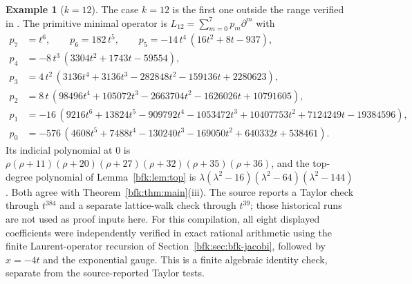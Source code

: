 \documentclass[11pt,a4paper]{article}
\theoremstyle{definition}
\newtheorem{example}[theorem]{Example}
\theoremstyle{remark}
\numberwithin{equation}{section}
\begin{document}
\begin{example}[$k=12$]\label{bfk:ex:k12}
The case $k=12$ is the first one outside the range verified in \cite{BG00}. The primitive minimal operator is $L_{12}=\sum_{m=0}^7p_m\partial^m$ with
\begin{align*}
p_7&=t^6,\qquad p_6=182\,t^5,\qquad p_5=-14\,t^4\,(16t^2+8t-937),\\
p_4&=-8\,t^3\,(3304t^2+1743t-59554),\\
p_3&=4\,t^2\,(3136t^4+3136t^3-282848t^2-159136t+2280623),\\
p_2&=8\,t\,(98496t^4+105072t^3-2663704t^2-1626026t+10791605),\\
p_1&=-16\,(9216t^6+13824t^5-909792t^4-1053472t^3+10407753t^2+7124249t-19384596),\\
p_0&=-576\,(4608t^5+7488t^4-130240t^3-169050t^2+640332t+538461).
\end{align*}
Its indicial polynomial at $0$ is $\rho(\rho+11)(\rho+20)(\rho+27)(\rho+32)(\rho+35)(\rho+36)$, and the top-degree polynomial of Lemma~\ref{bfk:lem:top} is $\lambda(\lambda^2-16)(\lambda^2-64)(\lambda^2-144)$. Both agree with Theorem~\ref{bfk:thm:main}(iii). The source reports a Taylor check through $t^{384}$ and a separate lattice-walk check through $t^{39}$; those historical runs are not used as proof inputs here. For this compilation, all eight displayed coefficients were independently
verified in exact rational arithmetic using the finite Laurent-operator
recursion of Section~\ref{bfk:sec:bfk-jacobi}, followed by $x=-4t$ and the
exponential gauge. This is a finite algebraic identity check, separate from
the source-reported Taylor tests.
\end{example}
\end{document}
